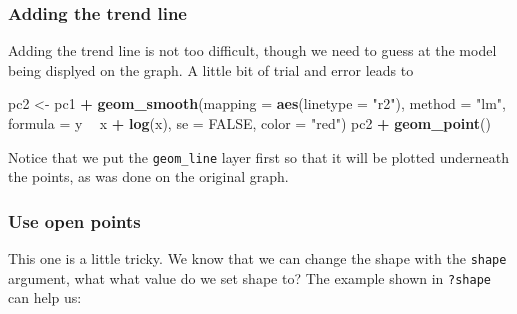\documentclass[]{book}
\newenvironment{Shaded}{\begin{snugshade}}{\end{snugshade}}
\newcommand{\KeywordTok}[1]{\textcolor[rgb]{0.13,0.29,0.53}{\textbf{#1}}}
\newcommand{\DataTypeTok}[1]{\textcolor[rgb]{0.13,0.29,0.53}{#1}}
\newcommand{\StringTok}[1]{\textcolor[rgb]{0.31,0.60,0.02}{#1}}
\newcommand{\OtherTok}[1]{\textcolor[rgb]{0.56,0.35,0.01}{#1}}
\newcommand{\OperatorTok}[1]{\textcolor[rgb]{0.81,0.36,0.00}{\textbf{#1}}}
\newcommand{\NormalTok}[1]{#1}
\begin{document}
\subsubsection{Adding the trend line}\label{adding-the-trend-line}

Adding the trend line is not too difficult, though we need to guess at
the model being displyed on the graph. A little bit of trial and error
leads to

\begin{Shaded}
\begin{Highlighting}[]
\NormalTok{pc2 <-}\StringTok{ }\NormalTok{pc1 }\OperatorTok{+}
\StringTok{  }\KeywordTok{geom_smooth}\NormalTok{(}\DataTypeTok{mapping =} \KeywordTok{aes}\NormalTok{(}\DataTypeTok{linetype =} \StringTok{"r2"}\NormalTok{),}
              \DataTypeTok{method =} \StringTok{"lm"}\NormalTok{,}
              \DataTypeTok{formula =}\NormalTok{ y }\OperatorTok{~}\StringTok{ }\NormalTok{x }\OperatorTok{+}\StringTok{ }\KeywordTok{log}\NormalTok{(x), }\DataTypeTok{se =} \OtherTok{FALSE}\NormalTok{,}
              \DataTypeTok{color =} \StringTok{"red"}\NormalTok{)}
\NormalTok{pc2 }\OperatorTok{+}\StringTok{ }\KeywordTok{geom_point}\NormalTok{()}
\end{Highlighting}
\end{Shaded}

Notice that we put the \texttt{geom\_line} layer first so that it will
be plotted underneath the points, as was done on the original graph.

\subsubsection{Use open points}\label{use-open-points}

This one is a little tricky. We know that we can change the shape with
the \texttt{shape} argument, what what value do we set shape to? The
example shown in \texttt{?shape} can help us:
\end{document}
